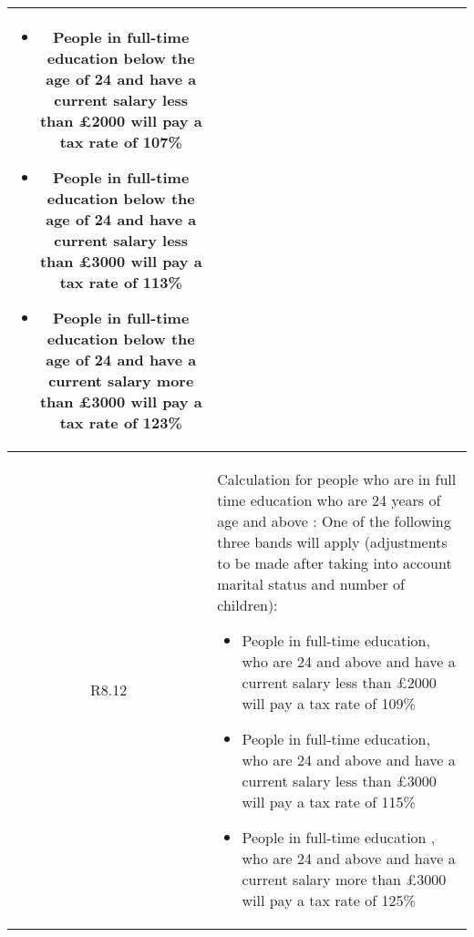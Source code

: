 \begin{table}[H]
\begin{tabularx}{\textwidth}{| c | X |}
	\begin{itemize}[itemsep=\tableitemsep, leftmargin=\tableleftsep]
		\item People in full-time education below the age of 24 and have a current salary less than £2000 will pay a tax rate of 107\%
		\item People in full-time education below the age of 24 and have a current salary less than £3000 will pay a tax rate of 113\%
		\item People in full-time education below the age of 24 and have a current salary more than £3000 will pay a tax rate of 123\%
	\end{itemize}
	\\
	\hline %
	R8.12 & Calculation for people who are in full time education who are 24 years of age and above : One of the following three bands will apply (adjustments to be made after taking into account marital status and number of children):
	\begin{itemize}[itemsep=\tableitemsep, leftmargin=\tableleftsep]
	\item People in full-time education, who are 24 and above and have a current salary less than £2000 will pay a tax rate of 109\%
	\item People in full-time education, who are 24 and above and have a current salary less than £3000 will pay a tax rate of 115\%
	\item People in full-time education , who are 24 and above and have a current salary more than £3000 will pay a tax rate of 125\%
	\end{itemize}
	\\
	\hline %
\end{tabularx}
\end{table}
